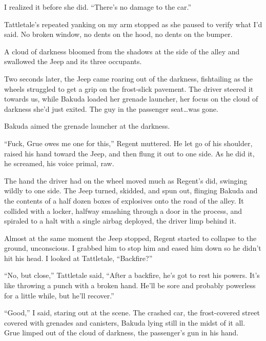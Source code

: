 I realized it before she did. ``There's no damage to the car.''



Tattletale's repeated yanking on my arm stopped as she paused to verify what I'd said.  No broken window, no dents on the hood, no dents on the bumper.



A cloud of darkness bloomed from the shadows at the side of the alley and swallowed the Jeep and its three occupants.



Two seconds later, the Jeep came roaring out of the darkness, fishtailing as the wheels struggled to get a grip on the frost-slick pavement.  The driver steered it towards us, while Bakuda loaded her grenade launcher, her focus on the cloud of darkness she'd just exited.  The guy in the passenger seat\ldots was gone.



Bakuda aimed the grenade launcher at the darkness.



``Fuck, Grue owes me one for this,'' Regent muttered.  He let go of his shoulder, raised his hand toward the Jeep, and then flung it out to one side.  As he did it, he screamed, his voice primal, raw.



The hand the driver had on the wheel moved much as Regent's did, swinging wildly to one side.  The Jeep turned, skidded, and spun out, flinging Bakuda and the contents of a half dozen boxes of explosives onto the road of the alley.  It collided with a locker, halfway smashing through a door in the process, and spiraled to a halt with a single airbag deployed, the driver limp behind it.



Almost at the same moment the Jeep stopped, Regent started to collapse to the ground, unconscious.  I grabbed him to stop him and eased him down so he didn't hit his head.  I looked at Tattletale, ``Backfire?''



``No, but close,'' Tattletale said, ``After a backfire, he's got to rest his powers.  It's like throwing a punch with a broken hand.  He'll be sore and probably powerless for a little while, but he'll recover.''



``Good,'' I said, staring out at the scene.  The crashed car, the frost-covered street covered with grenades and canisters, Bakuda lying still in the midst of it all.  Grue limped out of the cloud of darkness, the passenger's gun in his hand.



